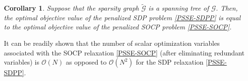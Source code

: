 \documentclass[journal,twoside]{IEEEtran}
\newtheorem{corollary}{Corollary}
\newcommand{\norm}[1]{\left\lVert#1\right\rVert_2}
\newcommand{\bX}{\mathbf{X}}
\newcommand{\cL}{{\mathcal L}}
\newcommand{\cN}{{\mathcal N}}
\newcommand{\cT}{{\mathcal T}}
\begin{document}
\begin{corollary}
Suppose that the sparsity graph $\tilde{\mathcal G}$ is  a spanning tree of $\mathcal{G}$. Then,  the optimal objective value of the penalized SDP problem \eqref{PSSE-SDPP} is equal to the optimal objective value of the penalized SOCP  problem \eqref{PSSE-SOCP}.
\end{corollary}
It can be readily shown that the number of scalar optimization variables associated with the SOCP relaxation  \eqref{PSSE-SOCP} (after eliminating redundant variables) is $\mathcal{O}(N)$
as opposed to $\mathcal{O}(N^2)$ for the SDP relaxation \eqref{PSSE-SDPP}.
\end{document}
